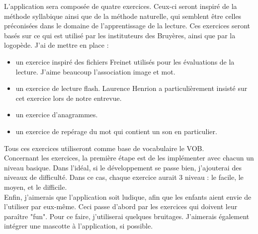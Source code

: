 L'application sera composée de quatre exercices. Ceux-ci seront inspiré de la méthode syllabique ainsi que de la méthode naturelle, qui semblent être celles préconisées dans le domaine de l'apprentissage de la lecture. Ces exercices seront basés sur ce qui est utilisé par les instituteurs des Bruyères, ainsi que par la logopède. J'ai de mettre en place :
\begin{itemize}
\item un exercice inspiré des fichiers Freinet utilisés pour les évaluations de la lecture. J'aime beaucoup l'association image et mot.
\item un exercice de lecture flash. Laurence Henrion a particulièrement insisté sur cet exercice lors de notre entrevue.
\item un exercice d'anagrammes.
\item un exercice de repérage du mot qui contient un son en particulier.
\end{itemize}
Tous ces exercices utiliseront comme base de vocabulaire le VOB.\\

Concernant les exercices, la première étape est de les implémenter avec chacun un niveau basique. Dans l'idéal, si le développement se passe bien, j'ajouterai des niveaux de difficulté. Dans ce cas, chaque exercice aurait 3 niveau : le facile, le moyen, et le difficile.\\

Enfin, j'aimerais que l'application soit ludique, afin que les enfants aient envie de l'utiliser par eux-même. Ceci passe d'abord par les exercices qui doivent leur paraître "fun". Pour ce faire, j'utiliserai quelques bruitages. J'aimerais également intégrer une mascotte à l'application, si possible.